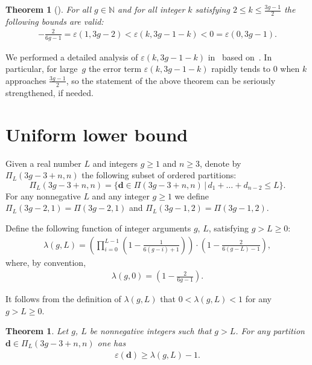 \documentclass[11pt]{article}
\renewcommand{\epsilon}{\varepsilon}
\newcommand\N{\mathbb N}
\newtheorem{Theorem}{Theorem}
\newtheorem*{NNTheorem}{Theorem}
\theoremstyle{definition}
\begin{document}
\begin{NNTheorem}[\cite{DGZZ:volume}]
For all $g\in\N$ and for all integer $k$ satisfying
$2\le k\le \frac{3g-1}{2}$ the following bounds are valid:
\begin{gather}\label{eq:main:bounds}
- \frac{2}{6g-1}=\epsilon(1,3g-2)< \epsilon(k,3g-1-k)< 0=\epsilon(0,3g-1) .
\end{gather}
\end{NNTheorem}

We performed a detailed analysis of $\epsilon(k,3g-1-k)$ in~\cite{DGZZ:volume}
based on~\cite{Zograf:2:correlators}. In particular, for large~$g$ the error term $\epsilon(k,3g-1-k)$ rapidly tends to $0$ when $k$ approaches $\frac{3g-1}{2}$, so the statement of the above theorem can be seriously strengthened, if needed.

\setcounter{section}{1}
\setcounter{subsection}{1}
\setcounter{subsubsection}{0}
\setcounter{Theorem}{4}
\setcounter{equation}{6}
\section{Uniform lower bound}\label{s:Uniform:lower:bound}

Given a real
number $L$ and integers $g\ge 1$ and $n\ge 3$, denote
by $\Pi_L(3g-3+n,n)$ the following subset
of ordered partitions:
\[
\Pi_L(3g-3+n,n)=\big\{\boldsymbol{d}\in\Pi(3g-3+n,n) \,\big|\, d_1+\dots+d_{n-2} \le L \big\} .
\]
For any nonnegative $L$ and any integer $g\ge 1$ we define
$\Pi_L(3g-2,1)=\Pi(3g-2,1)$ and
$\Pi_L(3g-1,2)=\Pi(3g-1,2)$.

Define the following function of integer arguments $g$, $L$, satisfying $g>L\ge 0$:
\begin{gather}
\label{eq:lambda}
\lambda(g,L)=\left(\prod_{i=0}^{L-1}\left(1-\frac{1}{6(g-i)+1}\right)\right)
\cdot\left(1-\frac{2}{6(g-L)-1}\right) ,
\end{gather}
where, by convention,
\begin{gather}
\label{eq:lambda:0}
\lambda(g,0)=\left(1-\frac{2}{6g-1}\right) .
\end{gather}

It follows from the definition of $\lambda(g,L)$ that $0<\lambda(g,L)<1$ for any $g>L\ge 0$.

\begin{Theorem}\label{th:Main:Theorem}
Let $g$, $L$ be nonnegative integers such that $g>L$. For any partition
$\boldsymbol{d}\in\Pi_{L}(3g-3+n,n)$ one has
\begin{gather}
\label{eq:1:plus:epsilon:samller:than:lambda}
\epsilon(\boldsymbol{d})\ge\lambda(g,L)-1 .
\end{gather}
\end{Theorem}
\end{document}
